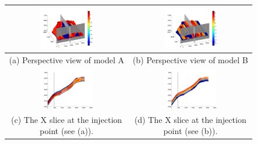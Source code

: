 \begin{figure}
\begin{tabular}{cc}
\includegraphics[width=0.45\textwidth]{./figurer/C02222_LogKz_pers}&
\includegraphics[width=0.45\textwidth]{./figurer/C03211_LogKz_pers} \\ \hline  
(a) Perspective view of model A&(b) Perspective view of model B\\
\includegraphics[width=0.45\textwidth]{./figurer/C02222_LogKz_slcx}&
\includegraphics[width=0.45\textwidth]{./figurer/C03211_LogKz_slcx}
\\(c) The X slice at the injection point (see (a)).&
(d) The X slice at the injection point (see (b)).\\

\end{tabular}
\end{figure}

